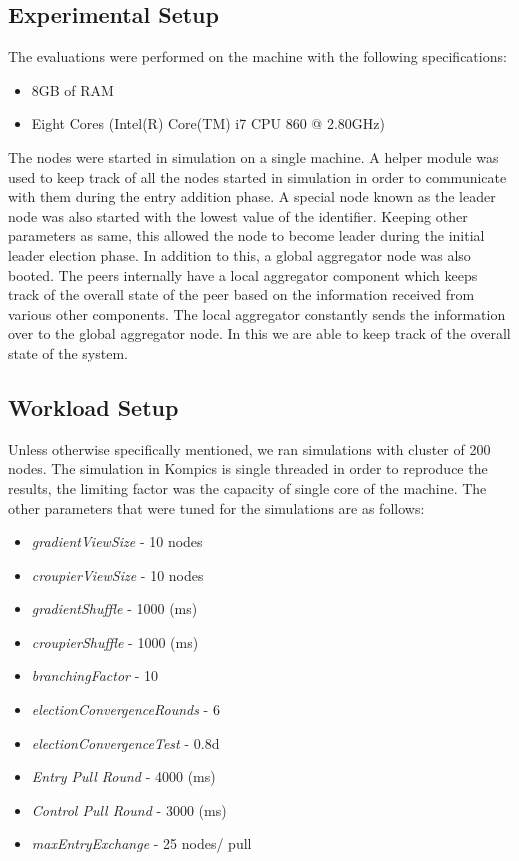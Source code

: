 \documentclass[a4paper, 11pt]{article}
\begin{document}
\subsection{Experimental Setup}

The evaluations were performed on the machine with the following specifications:

\begin{itemize}

\item 8GB of RAM
\item Eight Cores (Intel(R) Core(TM) i7 CPU 860  @ 2.80GHz)
\end{itemize}

The nodes were started in simulation on a single machine. A helper module was used to keep track of all the nodes started in simulation in order to communicate with them during the entry addition phase. A special node known as the leader node was also started with the lowest value of the identifier. Keeping other parameters as same, this allowed the node to become leader during the initial leader election phase. In addition to this, a global aggregator node was also booted. The peers internally have a local aggregator component which keeps track of the overall state of the peer based on the information received from various other components. The local aggregator constantly sends the information over to the global aggregator node. In this we are able to keep track of the overall state of the system.



\subsection{Workload Setup}

Unless otherwise specifically mentioned, we ran simulations with cluster of 200 nodes. The simulation in Kompics is single threaded in order to reproduce the results, the limiting factor was the capacity of single core of the machine. The other parameters that were tuned for the simulations are as follows:

\begin{itemize}
\setlength\itemsep{0em}
\item \textit{gradientViewSize} - 10 nodes
\item \textit{croupierViewSize} - 10 nodes
\item \textit{gradientShuffle} - 1000 (ms)
\item \textit{croupierShuffle} - 1000 (ms)
\item \textit{branchingFactor} - 10
\item \textit{electionConvergenceRounds} - 6
\item \textit{electionConvergenceTest} - 0.8d
\item \textit{Entry Pull Round} - 4000 (ms)
\item \textit{Control Pull Round} - 3000 (ms)
\item \textit{maxEntryExchange} - 25 nodes/ pull
\end{itemize}
\end{document}
